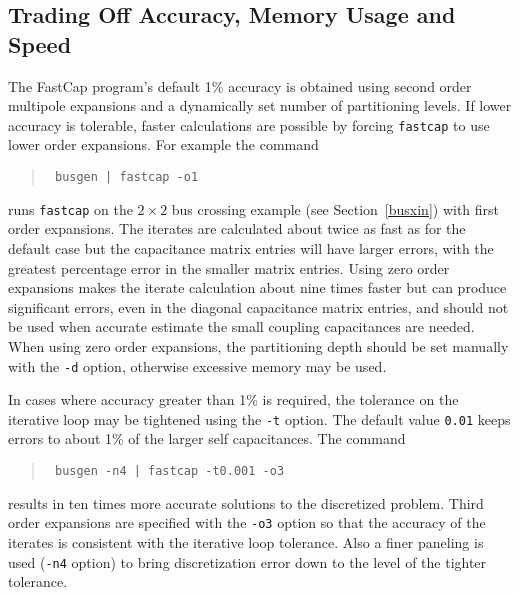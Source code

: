 \subsection{Trading Off Accuracy, Memory Usage and Speed}
\label{trdoff}

The FastCap program's default 1\% accuracy is obtained using second
order multipole expansions and a dynamically set number of partitioning
levels. If lower accuracy is tolerable, faster calculations are possible
by forcing {\tt fastcap} to use  lower order expansions. For example
the command
\begin{quote}\tt
busgen | fastcap -o1 
\end{quote}
runs {\tt fastcap} on the $2\times 2$ bus crossing example 
(see Section~\ref{busxin}) with first order
expansions. 
The iterates are calculated about twice as fast as for the default
case but the capacitance matrix entries will have larger errors, with
the greatest percentage error in the smaller matrix entries. 
Using zero order expansions makes the
iterate calculation about nine times faster but can produce significant
errors, even in the diagonal capacitance matrix entries,
and should not be used when accurate estimate the small
coupling capacitances are needed.
%
When using zero order expansions, the partitioning depth should be set
manually with the {\tt -d} option, otherwise excessive memory may be used.


In cases where accuracy greater than 1\% is required, the tolerance
on the iterative loop may be tightened using the {\tt -t} option.
The default value {\tt 0.01} keeps errors to about 1\% of the larger
self capacitances. The command
\begin{quote}\tt
busgen -n4 | fastcap -t0.001 -o3
\end{quote}
results in ten times more accurate solutions to the discretized problem.
Third order expansions are specified with the {\tt -o3} option so that
the accuracy of the iterates is consistent with the
iterative loop tolerance. Also a finer paneling is used
({\tt -n4} option) to bring discretization error down to the level of
the tighter tolerance.

